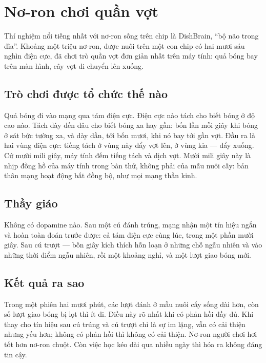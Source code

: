 \chapter{Nơ-ron chơi quần vợt}

Thí nghiệm nổi tiếng nhất với nơ-ron sống trên chip là DishBrain, ``bộ não trong đĩa''. Khoảng một triệu nơ-ron, được nuôi trên một con chip có hai mươi sáu nghìn điện cực, đã chơi trò quần vợt đơn giản nhất trên máy tính: quả bóng bay trên màn hình, cây vợt di chuyển lên xuống.

\section*{Trò chơi được tổ chức thế nào}

Quả bóng đi vào mạng qua tám điện cực. Điện cực nào tách cho biết bóng ở độ cao nào. Tách dày đến đâu cho biết bóng xa hay gần: bốn lần mỗi giây khi bóng ở sát bức tường xa, và dày dần, tới bốn mươi, khi nó bay tới gần vợt. Đầu ra là hai vùng điện cực: tiếng tách ở vùng này đẩy vợt lên, ở vùng kia --- đẩy xuống. Cứ mười mili giây, máy tính đếm tiếng tách và dịch vợt. Mười mili giây này là nhịp đồng hồ của máy tính trong bàn thử, không phải của mẫu nuôi cấy: bản thân mạng hoạt động bất đồng bộ, như mọi mạng thần kinh.


\section*{Thầy giáo}

Không có dopamine nào. Sau một cú đánh trúng, mạng nhận một tín hiệu ngắn và hoàn toàn đoán trước được: cả tám điện cực cùng lúc, trong một phần mười giây. Sau cú trượt --- bốn giây kích thích hỗn loạn ở những chỗ ngẫu nhiên và vào những thời điểm ngẫu nhiên, rồi một khoảng nghỉ, và một lượt giao bóng mới.

\section*{Kết quả ra sao}

Trong một phiên hai mươi phút, các lượt đánh ở mẫu nuôi cấy sống dài hơn, còn số lượt giao bóng bị lọt thì ít đi. Điều này rõ nhất khi có phản hồi đầy đủ. Khi thay cho tín hiệu sau cú trúng và cú trượt chỉ là sự im lặng, vẫn có cải thiện nhưng yếu hơn; không có phản hồi thì không có cải thiện. Nơ-ron người chơi hơi tốt hơn nơ-ron chuột. Còn việc học kéo dài qua nhiều ngày thì hóa ra không đáng tin cậy.

